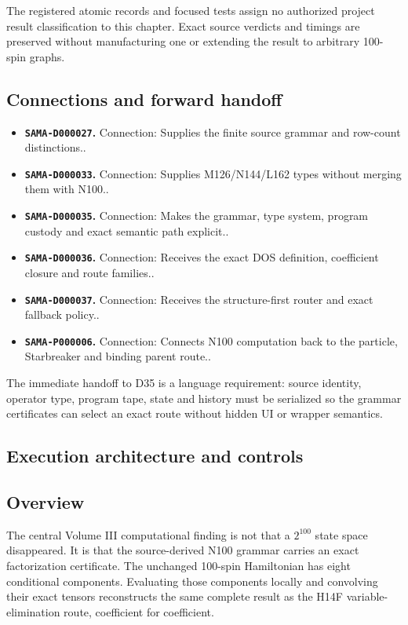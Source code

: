The registered atomic records and focused tests assign no authorized
project result classification to this chapter. Exact source verdicts and
timings are preserved without manufacturing one or extending the result
to arbitrary 100-spin graphs.

\subsection{Connections and forward
handoff}\label{viii-ch01-connections-and-forward-handoff}

\begin{itemize}
\tightlist
\item
  \textbf{\texttt{SAMA-D000027}.} Connection: Supplies the finite source
  grammar and row-count distinctions..
\item
  \textbf{\texttt{SAMA-D000033}.} Connection: Supplies M126/N144/L162
  types without merging them with N100..
\item
  \textbf{\texttt{SAMA-D000035}.} Connection: Makes the grammar, type
  system, program custody and exact semantic path explicit..
\item
  \textbf{\texttt{SAMA-D000036}.} Connection: Receives the exact DOS
  definition, coefficient closure and route families..
\item
  \textbf{\texttt{SAMA-D000037}.} Connection: Receives the
  structure-first router and exact fallback policy..
\item
  \textbf{\texttt{SAMA-P000006}.} Connection: Connects N100 computation
  back to the particle, Starbreaker and binding parent route..
\end{itemize}

The immediate handoff to D35 is a language requirement: source identity,
operator type, program tape, state and history must be serialized so the
grammar certificates can select an exact route without hidden UI or
wrapper semantics.

\subsection{Execution architecture and
controls}\label{viii-ch01-execution-architecture-and-controls}

\subsection{Overview}\label{viii-ch01-overview-1}

The central Volume III computational finding is not that a \(2^{100}\)
state space disappeared. It is that the source-derived N100 grammar
carries an exact factorization certificate. The unchanged 100-spin
Hamiltonian has eight conditional components. Evaluating those
components locally and convolving their exact tensors reconstructs the
same complete result as the H14F variable-elimination route, coefficient
for coefficient.

